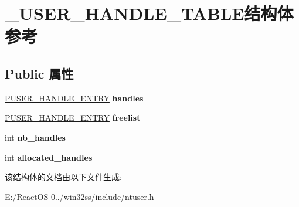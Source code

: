 \hypertarget{struct___u_s_e_r___h_a_n_d_l_e___t_a_b_l_e}{}\section{\+\_\+\+U\+S\+E\+R\+\_\+\+H\+A\+N\+D\+L\+E\+\_\+\+T\+A\+B\+L\+E结构体 参考}
\label{struct___u_s_e_r___h_a_n_d_l_e___t_a_b_l_e}
\subsection*{Public 属性}
\begin{DoxyCompactItemize}
\item 
\mbox{\label{struct___u_s_e_r___h_a_n_d_l_e___t_a_b_l_e_a74c06d3153946d5fbc5cc00da26f5141}} 
\hyperlink{struct___u_s_e_r___h_a_n_d_l_e___e_n_t_r_y}{P\+U\+S\+E\+R\+\_\+\+H\+A\+N\+D\+L\+E\+\_\+\+E\+N\+T\+RY} {\bfseries handles}
\item 
\mbox{\label{struct___u_s_e_r___h_a_n_d_l_e___t_a_b_l_e_acde142196478be7f80fcc9dfa22fdd0d}} 
\hyperlink{struct___u_s_e_r___h_a_n_d_l_e___e_n_t_r_y}{P\+U\+S\+E\+R\+\_\+\+H\+A\+N\+D\+L\+E\+\_\+\+E\+N\+T\+RY} {\bfseries freelist}
\item 
\mbox{\label{struct___u_s_e_r___h_a_n_d_l_e___t_a_b_l_e_a0ebac165877a93d71391ececaf7bad69}} 
int {\bfseries nb\+\_\+handles}
\item 
\mbox{\label{struct___u_s_e_r___h_a_n_d_l_e___t_a_b_l_e_aa778f3d4d3f8b456da7752989cfa45e6}} 
int {\bfseries allocated\+\_\+handles}
\end{DoxyCompactItemize}


该结构体的文档由以下文件生成\+:\begin{DoxyCompactItemize}
\item 
E\+:/\+React\+O\+S-\/0../win32ss/include/ntuser.\+h\end{DoxyCompactItemize}
